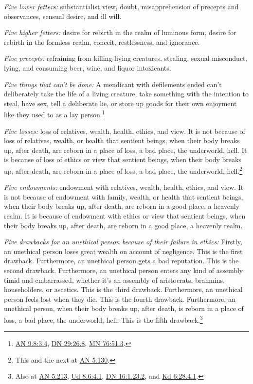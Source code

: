 \documentclass[12pt,openany]{book}%
\begin{document}
\emph{Five lower fetters:} substantialist view, doubt, misapprehension of precepts and observances, sensual desire, and ill will. 

\emph{Five higher fetters:} desire for rebirth in the realm of luminous form, desire for rebirth in the formless realm, conceit, restlessness, and ignorance. 

\emph{Five precepts:} refraining from killing living creatures, stealing, sexual misconduct, lying, and consuming beer, wine, and liquor intoxicants. 

\emph{Five things that can’t be done:} A mendicant with defilements ended can’t deliberately take the life of a living creature, take something with the intention to steal, have sex, tell a deliberate lie, or store up goods for their own enjoyment like they used to as a lay person.\footnote{\href{https://suttacentral.net/an9.8/en/sujato\#3.4}{AN 9.8:3.4}, \href{https://suttacentral.net/dn29/en/sujato\#26.8}{DN 29:26.8}, \href{https://suttacentral.net/mn76/en/sujato\#51.3}{MN 76:51.3}. } 

\emph{Five losses:} loss of relatives, wealth, health, ethics, and view. It is not because of loss of relatives, wealth, or health that sentient beings, when their body breaks up, after death, are reborn in a place of loss, a bad place, the underworld, hell. It is because of loss of ethics or view that sentient beings, when their body breaks up, after death, are reborn in a place of loss, a bad place, the underworld, hell.\footnote{This and the next at \href{https://suttacentral.net/an5.130/en/sujato}{AN 5.130}. } 

\emph{Five endowments:} endowment with relatives, wealth, health, ethics, and view. It is not because of endowment with family, wealth, or health that sentient beings, when their body breaks up, after death, are reborn in a good place, a heavenly realm. It is because of endowment with ethics or view that sentient beings, when their body breaks up, after death, are reborn in a good place, a heavenly realm. 

\emph{Five drawbacks for an unethical person because of their failure in ethics:} Firstly, an unethical person loses great wealth on account of negligence. This is the first drawback. Furthermore, an unethical person gets a bad reputation. This is the second drawback. Furthermore, an unethical person enters any kind of assembly timid and embarrassed, whether it’s an assembly of aristocrats, brahmins, householders, or ascetics. This is the third drawback. Furthermore, an unethical person feels lost when they die. This is the fourth drawback. Furthermore, an unethical person, when their body breaks up, after death, is reborn in a place of loss, a bad place, the underworld, hell. This is the fifth drawback.\footnote{Also at \href{https://suttacentral.net/an5.213/en/sujato}{AN 5.213}, \href{https://suttacentral.net/ud8.6/en/sujato\#4.1}{Ud 8.6:4.1}, \href{https://suttacentral.net/dn16/en/sujato\#1.23.2}{DN 16:1.23.2}, and \href{https://suttacentral.net/pli-tv-kd6/en/sujato\#28.4.1}{Kd 6:28.4.1}. } 
\end{document}
